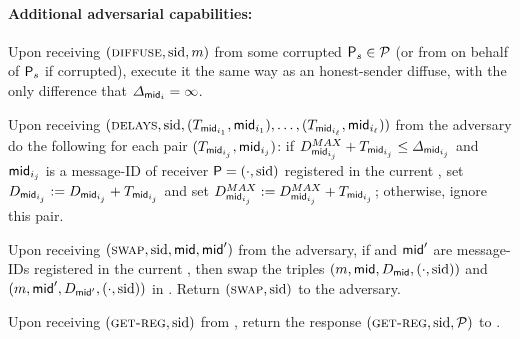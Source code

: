 \begin{cccFunctionality}
      \paragraph{Additional adversarial capabilities:}
      \begin{cccItemize}[nosep]
            \item Upon receiving $(\textsc{diffuse}, \mathrm{sid}, m)$ from some corrupted $\mathsf{P}_s \in \mathcal{P}$ (or from \adv on behalf of $\mathsf{P}_s$ if corrupted),
            execute it the same way as an honest-sender diffuse, with the only difference that $\varDelta_{\mathsf{mid}_i} = \infty$.

            \item Upon receiving $(\textsc{delays}, \mathrm{sid}, (T_{\mathsf{mid}_{i_1}}, \mathsf{mid}_{i_1}), \ldots, (T_{\mathsf{mid}_{i_\ell}}, \mathsf{mid}_{i_\ell}))$ from the adversary do the following for each pair $(T_{\mathsf{mid}_{i_j}}, \mathsf{mid}_{i_j})$:
            if $D^{MAX}_{\mathsf{mid}_{i_j}} + T_{\mathsf{mid}_{i_j}} \le \varDelta_{\mathsf{mid}_{i_j}}$ and $\mathsf{mid}_{i_j}$ is a message-ID of receiver $\mathsf{P} = (\cdot, \mathrm{sid})$ registered in the current \vecM, set $D_{\mathsf{mid}_{i_j}} := D_{\mathsf{mid}_{i_j}} + T_{\mathsf{mid}_{i_j}}$ and set $D^{MAX}_{\mathsf{mid}_{i_j}} := D^{MAX}_{\mathsf{mid}_{i_j}} + T_{\mathsf{mid}_{i_j}}$; otherwise, ignore this pair.

            \item Upon receiving $(\textsc{swap}, \mathrm{sid}, \mathsf{mid}, \mathsf{mid}')$ from the adversary, if \msgid and $\mathsf{mid}'$ are message-IDs registered in the current \vecM, then swap the triples $(m, \mathsf{mid}, D_\mathsf{mid}, (\cdot, \mathrm{sid}))$ and $(m, \mathsf{mid}', D_{\mathsf{mid}'}, (\cdot, \mathrm{sid}))$ in \vecM.
            Return $(\textsc{swap}, \mathrm{sid})$ to the adversary.

            \item Upon receiving $(\textsc{get-reg}, \mathrm{sid})$ from \adv, return the response $(\textsc{get-reg}, \mathrm{sid}, \mathcal{P})$ to \adv.
      \end{cccItemize}
\end{cccFunctionality}